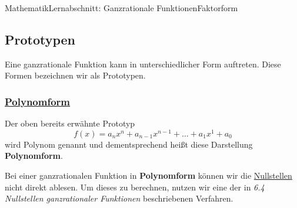\documentclass[11pt,twocolumn,oneside,openany,headings=optiontotoc,11pt,numbers=noenddot]{article}
\begin{document}
	\begin{worksheet}{Mathematik}{Lernabschnitt: Ganzrationale Funktionen}{Faktorform}
		\setcounter{section}{6}
		\setcounter{subsection}{1}
		\noindent
		\subsection{Prototypen}
		Eine ganzrationale Funktion kann in unterschiedlicher Form auftreten. Diese Formen bezeichnen wir als Prototypen.
		\subsubsection{\underline{Polynomform}}
		Der oben bereits erwähnte Prototyp \[f(x) = a_nx^n + a_{n-1}x^{n-1} + \ldots + a_1x^1 + a_0\] wird Polynom genannt und dementsprechend heißt diese Darstellung \textbf{Polynomform}.
		\begin{framed}
			\noindent
			Bei einer ganzrationalen Funktion in \textbf{Polynomform} können wir die \underline{Nullstellen} nicht direkt ablesen. Um dieses zu berechnen, nutzen wir eine der in \textit{6.4 Nullstellen ganzrationaler Funktionen} beschriebenen Verfahren.
		\end{framed}

\end{worksheet}
\end{document}
